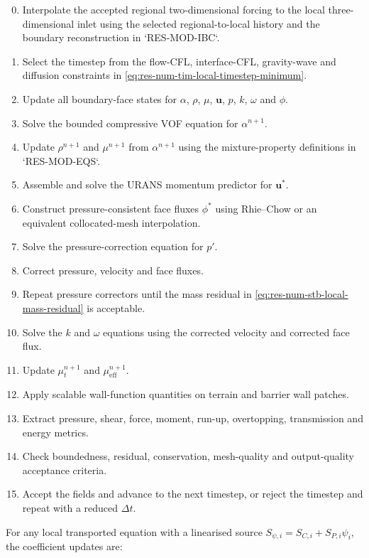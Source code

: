 \begin{enumerate}
  \setcounter{enumi}{-1}
  \item Interpolate the accepted regional two-dimensional forcing to
    the local three-dimensional inlet using the selected
    regional-to-local history and the boundary reconstruction in
    `RES-MOD-IBC`.
  \item Select the timestep from the flow-CFL, interface-CFL,
    gravity-wave and diffusion constraints in
    \cref{eq:res-num-tim-local-timestep-minimum}.
  \item Update all boundary-face states for
    $\alpha$, $\rho$, $\mu$, $\mathbf{u}$, $p$, $k$, $\omega$ and
    $\phi$.
  \item Solve the bounded compressive VOF equation for
    $\alpha^{n+1}$.
  \item Update $\rho^{n+1}$ and $\mu^{n+1}$ from
    $\alpha^{n+1}$ using the mixture-property definitions in
    `RES-MOD-EQS`.
  \item Assemble and solve the URANS momentum predictor for
    $\mathbf{u}^{*}$.
  \item Construct pressure-consistent face fluxes $\phi^{*}$ using
    Rhie--Chow or an equivalent collocated-mesh interpolation.
  \item Solve the pressure-correction equation for $p'$.
  \item Correct pressure, velocity and face fluxes.
  \item Repeat pressure correctors until the mass residual in
    \cref{eq:res-num-stb-local-mass-residual} is acceptable.
  \item Solve the $k$ and $\omega$ equations using the corrected
    velocity and corrected face flux.
  \item Update $\mu_t^{n+1}$ and $\mu_{\mathrm{eff}}^{n+1}$.
  \item Apply scalable wall-function quantities on terrain and barrier
    wall patches.
  \item Extract pressure, shear, force, moment, run-up, overtopping,
    transmission and energy metrics.
  \item Check boundedness, residual, conservation, mesh-quality and
    output-quality acceptance criteria.
  \item Accept the fields and advance to the next timestep, or reject
    the timestep and repeat with a reduced $\Delta t$.
\end{enumerate}

For any local transported equation with a linearised source
$S_{\psi,i}=S_{C,i}+S_{P,i}\psi_i$, the coefficient updates are:

